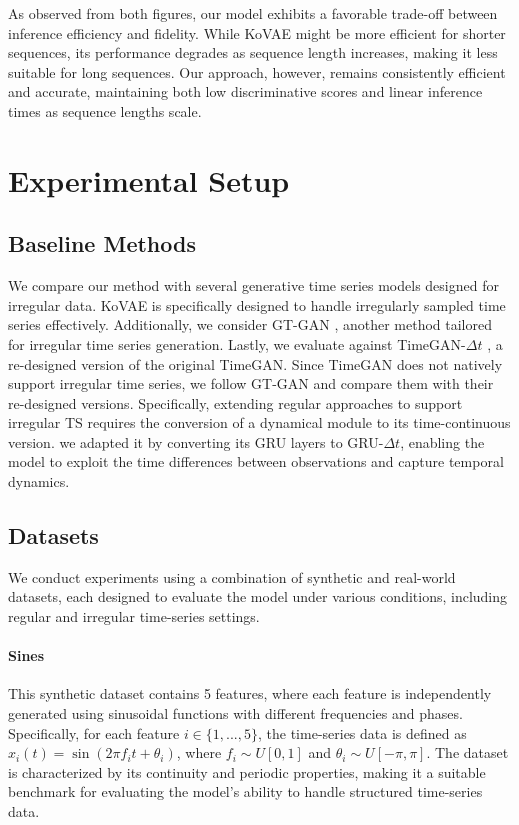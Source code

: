 \documentclass{article}
\theoremstyle{plain}
\theoremstyle{definition}
\theoremstyle{remark}
\begin{document}
As observed from both figures, our model exhibits a favorable trade-off between inference efficiency and fidelity. While KoVAE might be more efficient for shorter sequences, its performance degrades as sequence length increases, making it less suitable for long sequences. Our approach, however, remains consistently efficient and accurate, maintaining both low discriminative scores and linear inference times as sequence lengths scale.

    


\section{Experimental Setup}

\subsection{Baseline Methods}
We compare our method with several generative time series models designed for irregular data. KoVAE \cite{naiman2024generative} is specifically designed to handle irregularly sampled time series effectively. Additionally, we consider GT-GAN \cite{jeon2022gt}, another method tailored for irregular time series generation. Lastly, we evaluate against TimeGAN-$\Delta t$ \cite{yoon2019time}, a re-designed version of the original TimeGAN. Since TimeGAN does not natively support irregular time series, we follow GT-GAN and compare them with their
re-designed versions. Specifically, extending regular approaches to support irregular TS requires the conversion of a dynamical module to its time-continuous version. we adapted it by converting its GRU layers to GRU-$\Delta t$, enabling the model to exploit the time differences between observations and capture temporal dynamics.

\subsection{Datasets}
We conduct experiments using a combination of synthetic and real-world datasets, each designed to evaluate the model under various conditions, including regular and irregular time-series settings.

\paragraph{Sines} 
This synthetic dataset contains 5 features, where each feature is independently generated using sinusoidal functions with different frequencies and phases. Specifically, for each feature \( i \in \{1, ..., 5\} \), the time-series data is defined as \( x_i(t) = \sin(2\pi f_i t + \theta_i) \), where \( f_i \sim U[0, 1] \) and \( \theta_i \sim U[-\pi, \pi] \). The dataset is characterized by its continuity and periodic properties, making it a suitable benchmark for evaluating the model’s ability to handle structured time-series data.
\end{document}
